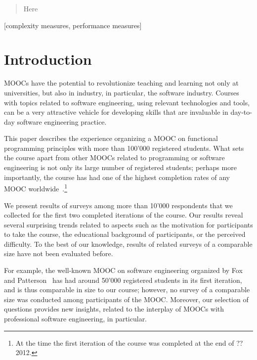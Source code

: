 \documentclass{sig-alternate}
\begin{document}
\maketitle
\begin{abstract}
Here
\end{abstract}

[complexity measures, performance measures]



\section{Introduction}

MOOCs have the potential to revolutionize teaching and learning not only at
universities, but also in industry, in particular, the software industry.
Courses with topics related to software engineering, using relevant
technologies and tools, can be a very attractive vehicle for developing skills
that are invaluable in day-to-day software engineering practice.

This paper describes the experience organizing a MOOC on functional
programming principles with more than 100'000 registered students. What sets
the course apart from other MOOCs related to programming or software
engineering is not only its large number of registered students; perhaps more
importantly, the course has had one of the highest completion rates of any
MOOC worldwide~\cite{THE}.\footnote{At the time the first iteration of the
course was completed at the end of ?? 2012.}

We present results of surveys among more than 10'000 respondents that we
collected for the first two completed iterations of the course. Our results
reveal several surprising trends related to aspects such as the motivation for
participants to take the course, the educational background of participants,
or the perceived difficulty. To the best of our knowledge, results of related
surveys of a comparable size have not been evaluated before.

For example, the well-known MOOC on software engineering organized by Fox and
Patterson~\cite{FoxP12} has had around 50'000 registered students in its first
iteration, and is thus comparable in size to our course; however, no survey of
a comparable size was conducted among participants of the MOOC. Moreover, our
selection of questions provides new insights, related to the interplay of
MOOCs with professional software engineering, in particular.
\end{document}
